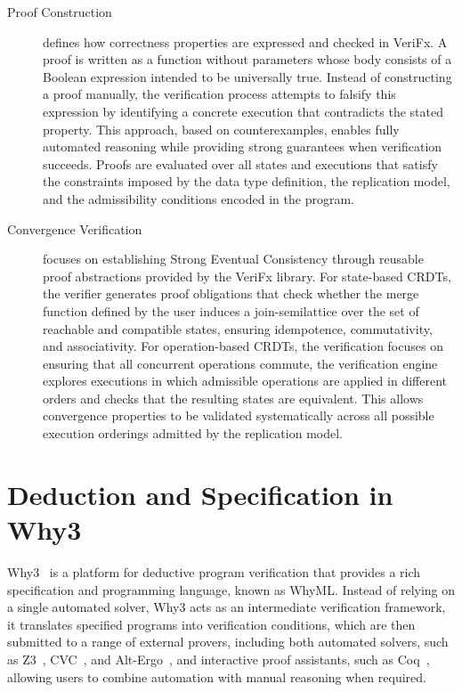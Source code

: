 \begin{description}
  \item[Proof Construction] defines how correctness properties are expressed and checked in VeriFx. A proof is written as a function without parameters whose body consists of a Boolean expression intended to be universally true. Instead of constructing a proof manually, the verification process attempts to falsify this expression by identifying a concrete execution that contradicts the stated property. This approach, based on counterexamples, enables fully automated reasoning while providing strong guarantees when verification succeeds. Proofs are evaluated over all states and executions that satisfy the constraints imposed by the data type definition, the replication model, and the admissibility conditions encoded in the program.

  \item[Convergence Verification] focuses on establishing Strong Eventual Consistency through reusable proof abstractions provided by the VeriFx library. For state-based CRDTs, the verifier generates proof obligations that check whether the merge function defined by the user induces a join-semilattice over the set of reachable and compatible states, ensuring idempotence, commutativity, and associativity. For operation-based CRDTs, the verification focuses on ensuring that all concurrent operations commute, the verification engine explores executions in which admissible operations are applied in different orders and checks that the resulting states are equivalent. This allows convergence properties to be validated systematically across all possible execution orderings admitted by the replication model.
\end{description}

\section{Deduction and Specification in Why3}
\label{sec:deduction}

Why3~\cite{why3} is a platform for deductive program verification that provides a rich specification and programming language, known as WhyML. Instead of relying on a single automated solver, Why3 acts as an intermediate verification framework, it translates specified programs into verification conditions, which are then submitted to a range of external provers, including both automated solvers, such as Z3~\cite{z3}, CVC~\cite{cvc}, and Alt-Ergo~\cite{alt-ergo}, and interactive proof assistants, such as Coq~\cite{coq}, allowing users to combine automation with manual reasoning when required.

